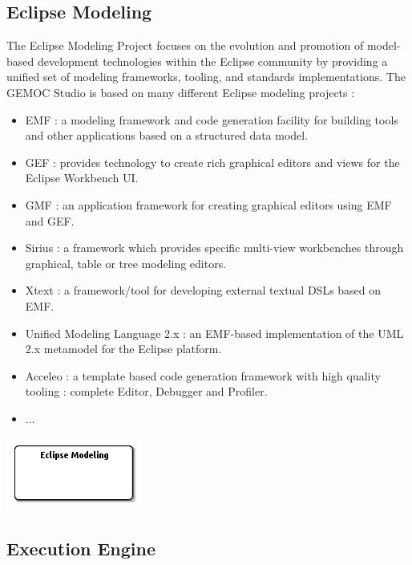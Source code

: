\documentclass{gemoc} %
\begin{document}
\subsection{Eclipse Modeling}
\label{sec:Eclipse_Modeling}

The Eclipse Modeling Project focuses on the evolution and promotion of model-based development technologies within the Eclipse community by providing a unified set of modeling frameworks, tooling, and standards implementations. The GEMOC Studio is based on many different Eclipse modeling projects :
\begin{itemize}
\item EMF : a modeling framework and code generation facility for building tools and other applications based on a structured data model.
\item GEF : provides technology to create rich graphical editors and views for the Eclipse Workbench UI.
\item GMF : an application framework for creating graphical editors using EMF and GEF.
\item Sirius : a framework which provides specific multi-view workbenches through graphical, table or tree modeling editors.
\item Xtext : a framework/tool for developing external textual DSLs based on EMF.
\item Unified Modeling Language 2.x : an EMF-based implementation of the UML 2.x metamodel for the Eclipse platform.
\item Acceleo : a template based code generation framework with high quality tooling : complete Editor, Debugger and Profiler.
\item ...
\end{itemize}
\begin{center}
\includegraphics*[trim=0.0cm 0.0cm 0cm 0.0cm, clip=true]{../images/generated/Generated_Eclipse_Modeling.png}
\end{center}




\subsection{Execution Engine}
\label{sec:Execution_Engine}
\end{document}
